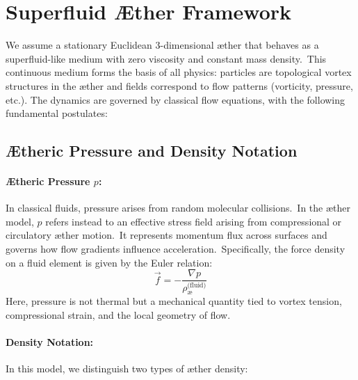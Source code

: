 \section{Superfluid Æther Framework}

We assume a stationary Euclidean 3-dimensional æther that behaves as a superfluid-like medium with zero viscosity and constant mass density.\ This continuous medium forms the basis of all physics: particles are topological vortex structures in the æther and fields correspond to flow patterns (vorticity, pressure, etc.). The dynamics are governed by classical flow equations, with the following fundamental postulates:

\vspace{1em}
\subsection*{Ætheric Pressure and Density Notation}

\paragraph{Ætheric Pressure \textbf{\( p \)}:}
In classical fluids, pressure arises from random molecular collisions.\ In the æther model,  \textbf{\( p \)} refers instead to an effective stress field arising from compressional or circulatory æther motion.\ It represents momentum flux across surfaces and governs how flow gradients influence acceleration.\ Specifically, the force density on a fluid element is given by the Euler relation:
\[
\vec{f} = -\frac{\nabla p}{\rho^{\text{(fluid)}}_{\text{\ae}}}
\]
Here, pressure is not thermal but a mechanical quantity tied to vortex tension, compressional strain, and the local geometry of flow.

\paragraph{Density Notation:}
In this model, we distinguish two types of æther density:

